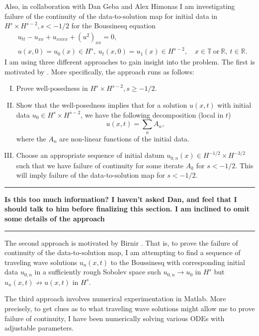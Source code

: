 \documentclass[12pt,reqno]{amsart}
\newcommand{\rr}{\mathbb{R}}
\newcommand{\ci}{\mathbb{T}}
\begin{document}
Also, in collaboration with Dan Geba and Alex Himonas
I am investigating failure of the continuity of the data-to-solution map for
initial data in $H^{s} \times H^{s-2}, s < -1/2$ for the Boussinesq equation
\begin{align}
   & u_{tt} - u_{xx} + u_{xxxx} + (u^{2})_{xx} = 0,
  \\
   & u(x,0) = u_{0}(x) \in H^{s}, \  u_{t}(x,0) = u_{1}(x) \in H^{s-2},
  \quad x \in \ci \ \text{or} \ \rr, \ t \in \rr. 
\end{align} 
I am using three
different approaches to gain insight into the problem. The first is motivated by
\cite{Bejenaru-Tao-2006-Sharp-well-posedness-and-ill-posedness}. More
specifically, the approach runs as follows:
\begin{enumerate}[I.]
  \item
    Prove well-posedness in $H^{s} \times H^{s-2}, s \ge -1/2$.
 \item
   Show that the well-posedness implies that for a solution $u(x,t)$ with
   initial data $u_{0} \in H^{s} \times H^{s-2}$, we have the following
   decomposition (local in $t$) 
   $$u(x,t) = \sum_{n} A_{n},$$ where the $A_{n}$ are non-linear functions of
   the initial data. 
 \item 
   Choose an appropriate sequence of initial datum $u_{0,n}(x) \in H^{-1/2}
   \times H^{-3/2}$ such that
   we have failure of continuity for some iterate $A_{k}$ for $s < -1/2$.
   This will imply
   failure of the data-to-solution map for $s < -1/2$.
   \end{enumerate}
%
\hrule
\textbf{Is this too much information? I haven't asked Dan, and feel that I should talk to him before
    finalizing this section. I am inclined to omit some details of the approach}
\hrule
The second approach is motivated by Birnir \cite{Birnir:1996uq}. That is,
to prove the failure of continuity of the data-to-solution map, I am attempting
to find a sequence of traveling wave solutions $u_{n}(x,t)$ to the Boussinesq with
corresponding initial data $u_{0,n}$ in a sufficiently rough Sobolev space such 
$u_{0,n} \to u_{0}$ in $H^{s}$ but $u_{n}(x,t) \not \to u(x,t)$ in $H^{s}$. 

The third approach involves numerical experimentation in Matlab. More
precisely, to get clues as to what traveling wave solutions might allow me
to prove failure of continuity, I have been numerically solving various ODEs
with adjustable parameters. 
\end{document}
